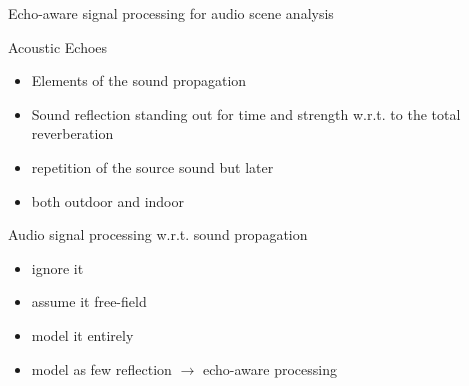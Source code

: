 
\begin{frame}[t]{\alert{Echo-aware signal processing for audio scene analysis}}

    \begin{mydefblock}{Acoustic Echoes}
        \begin{itemize}
            \item Elements of the sound propagation
            \item Sound reflection standing out for time and strength w.r.t. to the total reverberation
            \item repetition of the source sound but later
            \item both outdoor and indoor
        \end{itemize}
    \end{mydefblock}

    \vfill
    \begin{block}{}
        Audio signal processing w.r.t. sound propagation~\cite{chen1993time}
        \begin{itemize}
            \item ignore it
            \item assume it free-field
            \item model it entirely
            \item model as few reflection $\rightarrow$ echo-aware processing
        \end{itemize}

    \end{block}




\end{frame}

